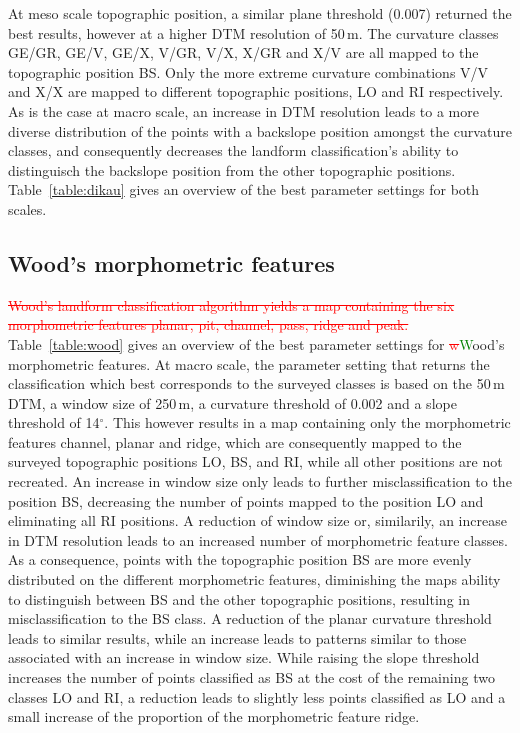 \documentclass[preprint,12pt,authoryear]{elsarticle}
\begin{document}
At meso scale topographic position, a similar plane threshold (0.007) returned the best results, however at a higher DTM resolution of 50\,m. The curvature classes GE/GR, GE/V, GE/X, V/GR, V/X, X/GR and X/V are all mapped to the topographic position BS. Only the more extreme curvature combinations V/V and X/X are mapped to different topographic positions, LO and RI respectively. As is the case at macro scale, an increase in DTM resolution leads to a more diverse distribution of the points with a backslope position amongst the curvature classes, and consequently decreases the landform classification's ability to distinguisch the backslope position from the other topographic positions. Table~\ref{table:dikau} gives an overview of the best parameter settings for both scales.

\subsection{Wood's morphometric features}
\textcolor{red}{\sout{Wood's landform classification algorithm yields a map containing the six morphometric features planar, pit, channel, pass, ridge and peak.}} Table~\ref{table:wood} gives an overview of the best parameter settings for \textcolor{red}{\sout{w}}\textcolor{green}Wood's morphometric features.
At macro scale, the parameter setting that returns the classification which best corresponds to the surveyed classes is based on the 50\,m DTM, a window size of 250\,m, a curvature threshold of 0.002 and a slope threshold of 14$^{\circ}$. This however results in a map containing only the morphometric features channel, planar and ridge, which are consequently mapped to the surveyed topographic positions LO, BS, and RI, while all other positions are not recreated. An increase in window size only leads to further misclassification to the position BS, decreasing the number of points mapped to the position LO and eliminating all RI positions. A reduction of window size or, similarily, an increase in DTM resolution leads to an increased number of morphometric feature classes. As a consequence, points with the topographic position BS are more evenly distributed on the different morphometric features, diminishing the maps ability to distinguish between BS and the other topographic positions, resulting in misclassification to the BS class. A reduction of the planar curvature threshold leads to similar results, while an increase leads to patterns similar to those associated with an increase in window size. While raising the slope threshold increases the number of points classified as BS at the cost of the remaining two classes LO and RI, a reduction leads to slightly less points classified as LO and a small increase of the proportion of the morphometric feature ridge. 
\end{document}
